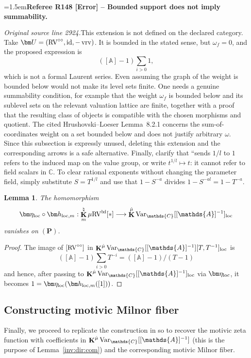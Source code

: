\documentclass[12pt]{amsart}
\newcommand{\RefereeRemark}[4]{%
  \par\medskip\begingroup\normalfont\small\color{RefereePurple}%
  \emergencystretch=1.5em\noindent\textbf{Referee R#1 [#2] -- #3.}\par\nobreak\noindent #4\par
  \endgroup\medskip
}
\theoremstyle{plain}
\newtheorem{lem}[thm]{Lemma}
\theoremstyle{definition}
\theoremstyle{remark}
\numberwithin{equation}{section}
\theoremstyle{plain}
\newcommand{\RV}{\textup{RV}}
\newcommand{\A}{\mathds{A}}
\newcommand{\C}{\mathds{C}}
\newcommand{\0}{\emptyset}
\newcommand{\fun}{\longrightarrow}
\newcommand{\mgRV}{{\mu}{\RV}}
\DeclareMathOperator{\ggk}{\mathbf{K}}
\DeclareMathOperator{\vrv}{vrv}
\DeclareMathOperator{\bdd}{b \! d}
\newcommand{\var}{\textup{Var}}
\newcommand{\loc}{\textup{loc}}
\newcommand{\gmv}{\ggk^{\hat \mu}\var_{\C}}
\newcommand{\ccirc}{\circ \circ}
\begin{document}
\RefereeRemark{148}{Error}{Bounded support does not imply summability}{%
\textit{Original source line 2924.}\quad This extension is not defined on the declared category. Take $\bm U=(\RV^{\circ\circ},\mathrm{id},-\vrv)$. It is bounded in the stated sense, but $\omega_f=0$, and the proposed expression is
\[
 ([\A]-1)\sum_{i>0}1,
\]
which is not a formal Laurent series. Even assuming the graph of the weight is bounded below would not make its level sets finite. One needs a genuine summability condition, for example that the weight $\omega_f$ is bounded below and its sublevel sets on the relevant valuation lattice are finite, together with a proof that the resulting class of objects is compatible with the chosen morphisms and quotient. The cited Hrushovski--Loeser Lemma~8.2.1 concerns the sum-of-coordinates weight on a set bounded below and does not justify arbitrary $\omega$. Since this subsection is expressly unused, deleting this extension and the corresponding arrows is a safe alternative. Finally, clarify that ``sends $1/l$ to $1$ refers to the induced map on the value group, or write $t^{1/l}\mapsto t$: it cannot refer to field scalars in $\C$. To clear rational exponents without changing the parameter field, simply substitute $S=T^{1/l}$ and use that $1-S^{-a}$ divides $1-S^{-al}=1-T^{-a}$.
}


\begin{lem}
\label{lem:hm:bounded}
The homomorphism
\[
\bm \eta_{\loc} \circ \bm h_{\loc,m} : \ggk^\natural_m \mgRV^{\bdd}[*] \fun \gmv[[\A]^{-1}]_{\loc}
\]
 vanishes on $(\bm P)$.
\end{lem}
\begin{proof}
The image of $[\RV^{\ccirc}]$ in $\gmv[[\A]^{-1}][T, T^{-1}]_{\loc}$ is
\[
 ([\A] - 1) \sum_{i > 0} T^{-i} = ([\A] - 1) / (T-1)
\]
and hence, after passing to $\gmv[[\A]^{-1}]_{\loc}$ via $\bm \eta_{\loc}$, it becomes $1 = \bm \eta_{\loc}( \bm h_{\loc,m}([1]))$.
\end{proof}




\subsection{Constructing motivic Milnor fiber}\label{sec:milnor}

Finally, we proceed to replicate the construction in \cite[\S~8]{hru:loe:lef} so to recover the motivic zeta function with coefficients in $\gmv[[\A]^{-1}]$ (this is the purpose of Lemma~\ref{inv:dir:com}) and the corresponding motivic Milnor fiber.
\end{document}

